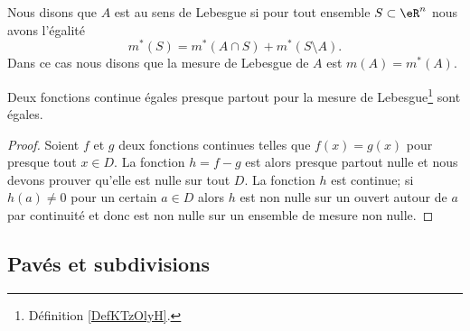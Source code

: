 \begin{definition}  \label{DefKTzOlyH}
Nous disons que \( A\) est  au sens de Lebesgue si pour tout ensemble \( S\subset \eR^n\) nous avons l'égalité
\begin{equation}
    m^*(S)=m^*(A\cap S)+m^*(S\setminus A).
\end{equation}
Dans ce cas nous disons que la mesure de Lebesgue de \( A\) est \( m(A)=m^*(A)\).
\end{definition}

\begin{proposition}     \label{PropNCMToWI}
    Deux fonctions continue égales presque partout pour la mesure de Lebesgue\footnote{Définition \ref{DefKTzOlyH}.} sont égales.
\end{proposition}

\begin{proof}
    Soient \( f\) et \( g\) deux fonctions continues telles que \( f(x)=g(x)\) pour presque tout \( x\in D\). La fonction \( h=f-g\) est alors presque partout nulle et nous devons prouver qu'elle est nulle sur tout \( D\). La fonction \( h\) est continue; si \( h(a)\neq 0\) pour un certain \( a\in D\) alors \( h\) est non nulle sur un ouvert autour de \( a\) par continuité et donc est non nulle sur un ensemble de mesure non nulle.
\end{proof}

\subsection{Pavés et subdivisions}

